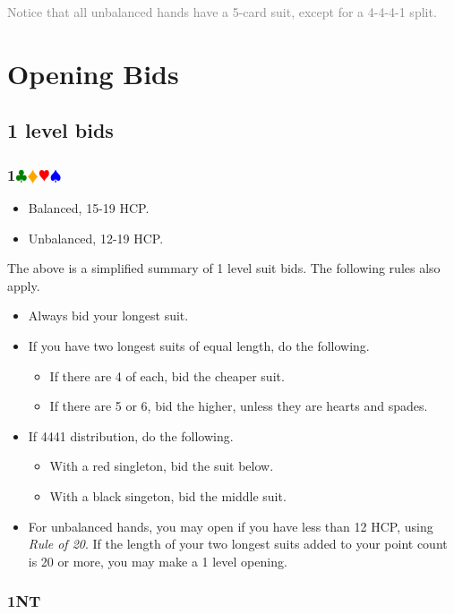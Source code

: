 \documentclass{article}
\newcommand{\Hs}{\textcolor{Red}{$\varheart$}}
\newcommand{\Ss}{\textcolor{Blue}{$\spadesuit$}}
\newcommand{\Ds}{\textcolor{Orange}{$\vardiamond$}}
\newcommand{\Cs}{\textcolor{Green}{$\clubsuit$}}
\newcommand{\NTs}{\textbf{\footnotesize{NT}}}
\newcommand{\NT}[1]{\textbf{#1\NTs}}
\newcommand{\suits}[1]{\textbf{#1}\Cs\Ds\Hs\Ss}
\newcommand{\note}[1]{\textcolor{gray}{#1}}
\begin{document}
\note{Notice that all unbalanced hands have a 5-card suit, except for a 4-4-4-1 split.}

\section{Opening Bids}

\subsection{1 level bids}

\subsubsection{\suits{1}}

\begin{itemize}
\item Balanced, 15-19 HCP.
\item Unbalanced, 12-19 HCP.
\end{itemize}

The above is a simplified summary of 1 level suit bids. The following rules also apply.

\begin{itemize}
\item Always bid your longest suit.
\item If you have two longest suits of equal length, do the following.
\begin{itemize}
\item If there are 4 of each, bid the cheaper suit. 
\item If there are 5 or 6, bid the higher, unless they are hearts and spades.
\end{itemize}
\item If 4441 distribution, do the following.
\begin{itemize}
\item With a red singleton, bid the suit below.
\item With a black singeton, bid the middle suit.
\end{itemize}
\item For unbalanced hands, you may open if you have less than 12 HCP, using \emph{Rule of 20}. If the length of your two longest suits added to your point count is 20 or more, you may make a 1 level opening.
\end{itemize}

\subsubsection{\NT{1}}
\end{document}
